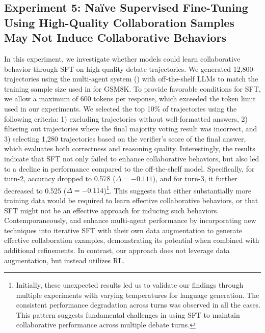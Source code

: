 \subsection{Experiment 5: Naïve Supervised Fine-Tuning Using High-Quality Collaboration Samples May Not Induce Collaborative Behaviors} 
\label{sec:exp3}
In this experiment, we investigate whether models could learn collaborative behavior through SFT on high-quality debate trajectories. We generated 12,800 trajectories using the multi-agent system () with off-the-shelf LLMs to match the training sample size used in \oursspace for GSM8K. To provide favorable conditions for SFT, we allow a maximum of 600 tokens per response, which exceeded the token limit used in our \oursspace experiments.
We selected the top 10\% of trajectories using the following criteria: 1) excluding trajectories without well-formatted answers, 2) filtering out trajectories where the final majority voting result was incorrect, and 3) selecting 1,280 trajectories based on the verifier's score of the final answer, which evaluates both correctness and reasoning quality. Interestingly, the results indicate that SFT not only failed to enhance collaborative behaviors,  but also led to a decline in performance compared to the off-the-shelf model. Specifically, for turn-2, accuracy dropped to 0.578 (\(\Delta = -0.111\)), and for turn-3, it further decreased to 0.525 (\(\Delta = -0.114\))\footnote{Initially, these unexpected results led us to validate our findings through multiple experiments with varying temperatures  for language generation. The consistent performance degradation across turns was observed in all the cases. This pattern suggests fundamental challenges in using SFT to maintain collaborative performance across multiple debate turns.}. 
 This suggests that either substantially more training data would be required to learn effective collaborative behaviors, or that SFT might not be an effective approach for inducing such behaviors. {Contemporaneously, \citet{subramaniam2025multiagent} and \citet{zhao2025sirius} enhance multi-agent performance by incorporating new techniques into iterative SFT with their own data augmentation to generate effective collaboration examples, demonstrating its potential when combined with additional refinements. In contrast, our approach does not leverage data augmentation, but instead utilizes RL.}







